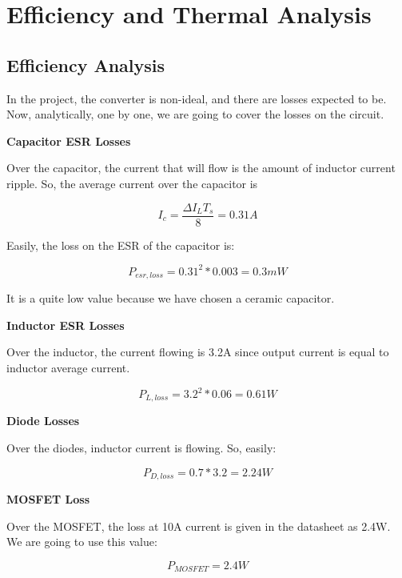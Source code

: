 \section{Efficiency and Thermal Analysis}
\subsection{Efficiency Analysis}

In the project, the converter is non-ideal, and there are losses expected to be. Now, analytically, one by one, we are going to cover the losses on the circuit.

\textbf{Capacitor ESR Losses}

Over the capacitor, the current that will flow is the amount of inductor current ripple. So, the average current over the capacitor is

\begin{equation}
    I_c = \dfrac{\Delta I_L T_s}{8} = 0.31A
\end{equation}

Easily, the loss on the ESR of the capacitor is:

\begin{equation}
    P_{esr,loss} = 0.31^2*0.003 = 0.3 mW
\end{equation}

It is a quite low value because we have chosen a ceramic capacitor.

\textbf{Inductor ESR Losses}

Over the inductor, the current flowing is 3.2A since output current is equal to inductor average current. 

\begin{equation}
    P_{L,loss} = 3.2^2*0.06 = 0.61W
\end{equation}

\textbf{Diode Losses}

Over the diodes, inductor current is flowing. So, easily:

\begin{equation}
    P_{D,loss} = 0.7 * 3.2 = 2.24W
\end{equation}

\textbf{MOSFET Loss}

Over the MOSFET, the loss at 10A current is given in the datasheet as 2.4W. We are going to use this value:

\begin{equation}
    P_{MOSFET} = 2.4W
\end{equation}


